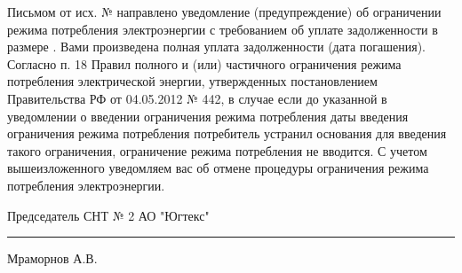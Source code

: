 Письмом от          исх. №         направлено уведомление (предупреждение) об  ограничении режима потребления электроэнергии с требованием об уплате задолженности в размере            .
Вами произведена полная уплата задолженности                (дата погашения).
Согласно п. 18 Правил полного и (или) частичного ограничения режима потребления электрической энергии, утвержденных постановлением Правительства РФ от 04.05.2012 № 442, в случае если до указанной в уведомлении о введении ограничения режима потребления даты введения ограничения режима потребления потребитель устранил основания для введения такого ограничения, ограничение режима потребления не вводится.
С учетом вышеизложенного уведомляем вас об отмене процедуры ограничения режима потребления электроэнергии. 
\vspace{5mm}



\vspace{15mm}
\noindent Председатель СНТ № 2 АО "Югтекс" \hfill    \rule{3cm}{0.1 mm}    Мраморнов А.В.